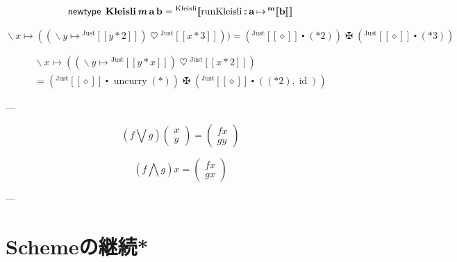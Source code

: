 \documentclass[a5paper,twoside,fleqn,draft]{jsbook}
\def\[{[\![}
\def\]{]\!]}
\newcommand{\programminglanguage}[1]{\textsf{#1}}
\newcommand{\scheme}{\programminglanguage{Scheme}}
\newcommand{\mKeyword}[1]{\mathsf{#1}}
\newcommand{\mNewTypeDeclKeyword}{\mKeyword{newtype}}
\DeclareMathOperator{\mNewTypeDecl}{\mNewTypeDeclKeyword}
\newcommand{\mAnonParam}{\diamond}
\newcommand{\mSpecialFunc}[1]{#1}
\DeclareMathOperator{\mId}{\mSpecialFunc{id}}
\DeclareMathOperator{\mUncurry}{\mSpecialFunc{uncurry}}
\DeclareMathOperator{\mBind}{\heartsuit}
\DeclareMathOperator{\mBindComp}{\maltese}
\DeclareMathOperator{\mComp}{\centerdot}
\DeclareMathOperator{\mFuncArrow}{\mapsto}
\DeclareMathOperator{\mIn}{{:\!:}}
\DeclareMathOperator{\mLambda}{\backslash}
\DeclareMathOperator{\mLambdaArrow}{\mapsto}
\newcommand{\mType}[1]{\mathbf{#1}} %
\newcommand{\mPolymorphicTypeParameter}[1]{\textbf{\textit{#1}}}
\newcommand{\mA}{\mType{a}}
\newcommand{\mB}{\mType{b}}
\newcommand{\mTypeAssemble}[2]{{}^\mType{#1}\[\mType{#2}\]}
\newcommand{\mValueConstructor}[1]{\mathrm{#1}}
\newcommand{\mValueWith}[2]{{}^\mValueConstructor{#1}\[#2\]}
\newcommand{\mJustWith}[1]{\mValueWith{Just}{#1}}
\newcommand{\mPairWith}[2]{\begin{pmatrix}#1\\#2\end{pmatrix}}
\begin{document}
\newcommand{\mKleisliType}{\mType{Kleisli}}
\newcommand{\mKleisliWith}[1]{\mValueWith{Kleisli}{#1}}
\newcommand{\mRunKleisli}{\mathop{\mathrm{runKleisli}}}

\begin{equation}
  \mNewTypeDecl\;
  \mKleisliType\,\mPolymorphicTypeParameter{m}\,\mA\,\mB
  =\mKleisliWith{\mRunKleisli\mIn\mA\mFuncArrow\mTypeAssemble{m}{b}}
\end{equation}

\begin{equation}
  \mLambda x\mLambdaArrow((\mLambda y\mLambdaArrow\mJustWith{y*2})\mBind{}\mJustWith{x*3}))
  =(\mJustWith{\mAnonParam}\mComp(*2))\mBindComp(\mJustWith{\mAnonParam}\mComp(*3))
\end{equation}

\begin{multline}
  \mLambda x\mLambdaArrow((\mLambda y\mLambdaArrow\mJustWith{y*x})\mBind{}\mJustWith{x*2})\\
  =(\mJustWith{\mAnonParam}\mComp\mUncurry(*))\mBindComp(\mJustWith{\mAnonParam}\mComp{}((*2),\mId))
\end{multline}

---

\begin{equation}
  \left(f\bigvee g\right)\mPairWith{x}{y}=\mPairWith{fx}{gy}
\end{equation}

\begin{equation}
  \left(f\bigwedge g\right)x=\mPairWith{fx}{gx}
\end{equation}

---



\section{\scheme の継続*}
\end{document}
